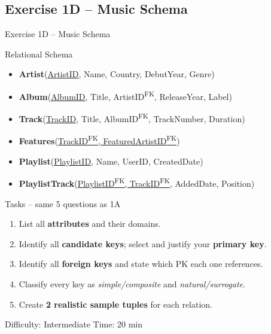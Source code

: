 \documentclass[10pt]{beamer}
\begin{document}
\subsection{Exercise 1D -- Music Schema}

\begin{frame}{Exercise 1D -- Music Schema}
  \begin{block}{Relational Schema}
    \small
    \begin{itemize}
      \item \textbf{Artist}(\underline{ArtistID}, Name, Country, DebutYear, Genre)
      \item \textbf{Album}(\underline{AlbumID}, Title, ArtistID\textsuperscript{FK}, ReleaseYear, Label)
      \item \textbf{Track}(\underline{TrackID}, Title, AlbumID\textsuperscript{FK}, TrackNumber, Duration)
      \item \textbf{Features}(\underline{TrackID\textsuperscript{FK}, FeaturedArtistID\textsuperscript{FK}})
      \item \textbf{Playlist}(\underline{PlaylistID}, Name, UserID, CreatedDate)
      \item \textbf{PlaylistTrack}(\underline{PlaylistID\textsuperscript{FK}, TrackID\textsuperscript{FK}}, AddedDate, Position)
    \end{itemize}
  \end{block}

  \begin{block}{Tasks -- same 5 questions as 1A}
    \begin{enumerate}
      \item List all \textbf{attributes} and their domains.
      \item Identify all \textbf{candidate keys}; select and justify your \textbf{primary key}.
      \item Identify all \textbf{foreign keys} and state which PK each one references.
      \item Classify every key as \emph{simple/composite} and \emph{natural/surrogate}.
      \item Create \textbf{2 realistic sample tuples} for each relation.
    \end{enumerate}
  \end{block}

  \begin{alertblock}{Difficulty: Intermediate \quad Time: 20 min}
  \end{alertblock}
\end{frame}
\end{document}
